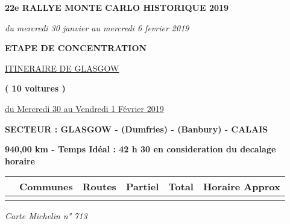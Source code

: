 \documentclass{article}%
\begin{document}
%
\normalsize%
\begin{center} \textbf{\LARGE{22e RALLYE MONTE CARLO HISTORIQUE 2019}} \end{center}%
\begin{flushleft} \textit{du mercredi 30 janvier au mercredi 6 fevrier 2019} \end{flushleft}%
\begin{center} \textbf{ETAPE DE CONCENTRATION} \end{center}%
\begin{center} \underline{ITINERAIRE DE GLASGOW} \end{center}%
\begin{center} \textbf{( 10 voitures )} \end{center}%
\begin{flushright} \underline{du Mercredi 30 au Vendredi 1 Février 2019} \end{flushright}%
\begin{flushleft} \textbf{SECTEUR : GLASGOW  - (Dumfries) - (Banbury) - CALAIS} \end{flushleft}%
\begin{flushright} \textbf{940,00 km - Temps Idéal : 42 h 30 en consideration du decalage horaire} \end{flushright}%
\begin{longtable}{p{2.25cm}|p{7.0cm}|p{1.5cm}|p{1.5cm}|p{1.5cm}|p{3.5cm}}%
\hline%
&Communes&Routes&Partiel&Total&Horaire Approx\\%
\hline%
\endhead%
\endfoot%
\endlastfoot%
\hline%
\end{longtable}%
\begin{flushleft} \textit{Carte Michelin n° 713
} \end{flushleft}%
\end{document}

